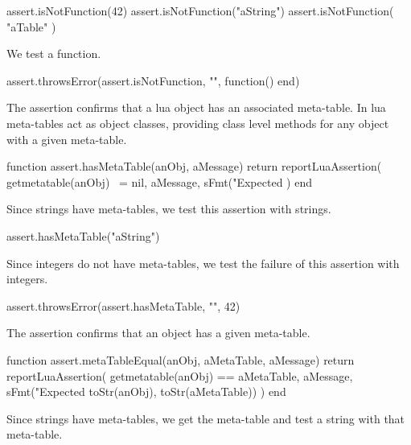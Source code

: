 \startLuaTest
  assert.isNotFunction(42)
  assert.isNotFunction("aString")
  assert.isNotFunction({ "aTable" })
\stopLuaTest
\stopTestCase


We test a function.

\startLuaTest
  assert.throwsError(assert.isNotFunction, "", function() end)
\stopLuaTest
\stopTestCase

\stopTestSuite


The  assertion confirms that a lua object has an 
associated meta-table. In lua meta-tables act as object classes, providing 
class level methods for any object with a given meta-table. 

\startLuaCode
function assert.hasMetaTable(anObj, aMessage)
  return reportLuaAssertion(
    getmetatable(anObj) ~= nil,
    aMessage,
    sFmt("Expected %
  )
end
\stopLuaCode


Since strings have meta-tables, we test this assertion with strings.

\startLuaTest
  assert.hasMetaTable("aString")
\stopLuaTest
\stopTestCase


Since integers do not have meta-tables, we test the failure of this 
assertion with integers. 

\startLuaTest
  assert.throwsError(assert.hasMetaTable, "", 42)
\stopLuaTest
\stopTestCase

\stopTestSuite


The  assertion confirms that an object has a 
given meta-table. 

\startLuaCode
function assert.metaTableEqual(anObj, aMetaTable, aMessage)
  return reportLuaAssertion(
    getmetatable(anObj) == aMetaTable,
    aMessage,
    sFmt("Expected %
      toStr(anObj), toStr(aMetaTable))
  )
end
\stopLuaCode


Since strings have meta-tables, we get the meta-table and test a string 
with that meta-table. 

